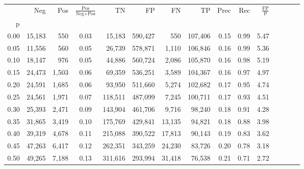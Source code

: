 \begin{tabular}{rrrcrrrrrrrrrrr}
\toprule
{} &     Neg &    Pos & $\frac{\text{Pos}}{\text{Neg}+\text{Pos}}$ &       TN &       FP &       FN &       TP &  Prec &   Rec & $\frac{\text{FP}}{\text{P}}$ \\
p    &         &        &                                            &          &          &          &          &       &       &                              \\
\midrule
0.00 &  15,183 &    550 &                                       0.03 &   15,183 &  590,427 &      550 &  107,406 &  0.15 &  0.99 &                         5.47 \\
0.05 &  11,556 &    560 &                                       0.05 &   26,739 &  578,871 &    1,110 &  106,846 &  0.16 &  0.99 &                         5.36 \\
0.10 &  18,147 &    976 &                                       0.05 &   44,886 &  560,724 &    2,086 &  105,870 &  0.16 &  0.98 &                         5.19 \\
0.15 &  24,473 &  1,503 &                                       0.06 &   69,359 &  536,251 &    3,589 &  104,367 &  0.16 &  0.97 &                         4.97 \\
0.20 &  24,591 &  1,685 &                                       0.06 &   93,950 &  511,660 &    5,274 &  102,682 &  0.17 &  0.95 &                         4.74 \\
0.25 &  24,561 &  1,971 &                                       0.07 &  118,511 &  487,099 &    7,245 &  100,711 &  0.17 &  0.93 &                         4.51 \\
0.30 &  25,393 &  2,471 &                                       0.09 &  143,904 &  461,706 &    9,716 &   98,240 &  0.18 &  0.91 &                         4.28 \\
0.35 &  31,865 &  3,419 &                                       0.10 &  175,769 &  429,841 &   13,135 &   94,821 &  0.18 &  0.88 &                         3.98 \\
0.40 &  39,319 &  4,678 &                                       0.11 &  215,088 &  390,522 &   17,813 &   90,143 &  0.19 &  0.83 &                         3.62 \\
0.45 &  47,263 &  6,417 &                                       0.12 &  262,351 &  343,259 &   24,230 &   83,726 &  0.20 &  0.78 &                         3.18 \\
0.50 &  49,265 &  7,188 &                                       0.13 &  311,616 &  293,994 &   31,418 &   76,538 &  0.21 &  0.71 &                         2.72 \\

\end{tabular}

